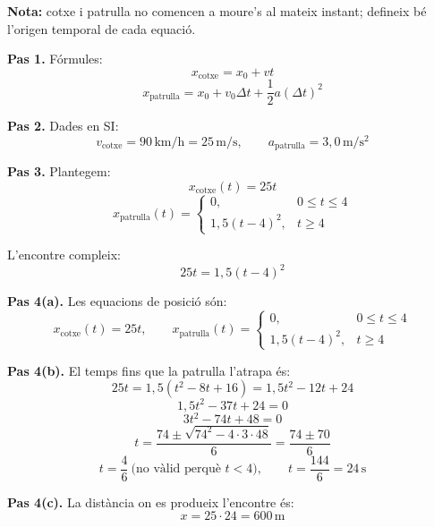 \documentclass[11pt,a4paper]{article}
\begin{document}
\textbf{Nota:} cotxe i patrulla no comencen a moure's al mateix instant; defineix bé l'origen temporal de cada equació.

\begin{solutionbox}
\textbf{Pas 1.} Fórmules:
\[
x_{\text{cotxe}}=x_0+vt
\]
\[
x_{\text{patrulla}}=x_0+v_0\Delta t+\frac{1}{2}a(\Delta t)^2
\]

\textbf{Pas 2.} Dades en SI:
\[
v_{\text{cotxe}}=90\,\mathrm{km/h}=25\,\mathrm{m/s}, \qquad a_{\text{patrulla}}=3{,}0\,\mathrm{m/s^2}
\]

\textbf{Pas 3.} Plantegem:
\[
x_{\text{cotxe}}(t)=25t
\]
\[
x_{\text{patrulla}}(t)=
\begin{cases}
0, & 0\le t\le 4 \\
1{,}5(t-4)^2, & t\ge 4
\end{cases}
\]

L'encontre compleix:
\[
25t=1{,}5(t-4)^2
\]

\textbf{Pas 4(a).} Les equacions de posició són:
\[
x_{\text{cotxe}}(t)=25t, \qquad
x_{\text{patrulla}}(t)=
\begin{cases}
0, & 0\le t\le 4 \\
1{,}5(t-4)^2, & t\ge 4
\end{cases}
\]

\textbf{Pas 4(b).} El temps fins que la patrulla l'atrapa és:
\[
25t=1{,}5(t^2-8t+16)=1{,}5t^2-12t+24
\]
\[
1{,}5t^2-37t+24=0
\]
\[
3t^2-74t+48=0
\]
\[
t=\frac{74\pm \sqrt{74^2-4\cdot 3\cdot 48}}{6}
=\frac{74\pm 70}{6}
\]
\[
t=\frac{4}{6}\ \text{(no vàlid perquè } t<4), \qquad t=\frac{144}{6}=24\,\mathrm{s}
\]

\textbf{Pas 4(c).} La distància on es produeix l'encontre és:
\[
x=25\cdot 24=600\,\mathrm{m}
\]
\end{solutionbox}
\end{document}
